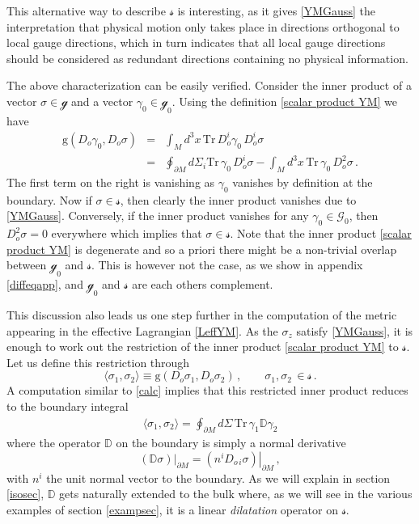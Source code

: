 \documentclass[11pt,a4paper]{article}
\def\calg{{\mathscr G}}
\def\calsg{{\boldsymbol{\mathscr g}}}
\def\calss{{\boldsymbol{\mathscr s}}}
\def\rg{{\mathrm{g}}}
\def\Tr{\mathrm{Tr}}
\def\Dperp{{\mathbb{D}}}
\begin{document}
    \noindent This alternative way to describe $\calss$ is interesting, as it gives \eqref{YMGauss} the interpretation that physical motion only takes place in directions orthogonal to local gauge directions, which in turn indicates that all local gauge directions should be considered as redundant directions containing no physical information. 
    
    The above characterization can be easily verified. Consider the inner product of a vector $\sigma\in\calsg$ and a vector $\gamma_0\in \calsg_0$. Using the definition \eqref{scalar product YM} we have
    \begin{eqnarray}
    \nonumber    \rg(D_o\gamma_0,D_o\sigma)&=&\int_M\! d^3x\, \Tr\,D_o^i\gamma_0\,D_o^i\sigma\nonumber\\
    &=&\oint_{\partial M}\! d\Sigma_i \Tr\,\gamma_0\,D_o^{i}\sigma\label{YMpi}-\int_M\! d^3x\, \Tr\,\gamma_0\,D_o^2\sigma\label{calc}\,.
    \end{eqnarray}
    The first term on the right is vanishing as $\gamma_0$ vanishes by definition at the boundary. Now if $\sigma\in \calss$, then clearly the inner product vanishes due to \eqref{YMGauss}. Conversely, if the inner product vanishes for any $\gamma_0\in \calg_0$, then $D_o^2\sigma=0$ everywhere which implies that $\sigma\in \calss$. Note that the inner product \eqref{scalar product YM} is degenerate and so a priori there might be a non-trivial overlap between $\calsg_0$ and $\calss$. This is however not the case, as we show in appendix \ref{diffeqapp}, and $\calsg_0$ and $\calss$ are each others complement.
    
    This discussion also leads us one step further in the computation of the metric appearing in the effective Lagrangian \eqref{LeffYM}. As the $\sigma_z$ satisfy \eqref{YMGauss}, it is enough to work out the restriction of the inner product \eqref{scalar product YM} to $\calss$. Let us define this restriction through
    \begin{equation}
    \langle\sigma_1,\sigma_2\rangle\equiv\rg(D_o\sigma_{1},D_o\sigma_{2})\,,\qquad \sigma_1,\sigma_2\,\in\calss\,.
    \end{equation}
    A computation similar to \eqref{calc} implies that this restricted inner product reduces to the boundary integral
    \begin{align}
\boxed{    \langle\sigma_1,\sigma_2\rangle=\oint_{\partial M}\! d\Sigma\, \Tr\,\gamma_{1} \Dperp \gamma_{2}\label{angles}}
    \end{align}
    where the operator $\Dperp$ on the boundary is simply a normal derivative
    \begin{equation}
    \left.(\Dperp\sigma)\right|_{\partial M}=\left.(n^i D_{o\,i}\sigma)\right|_{\partial M}\label{Dperpbound}\,,
    \end{equation} 
    with $n^i$ the unit normal vector to the boundary. As we will explain in section \ref{isosec}, $\Dperp$ gets naturally extended to the bulk where, as we will see in the various examples of section \ref{exampsec}, it is a linear \textit{dilatation} operator on $\calss$.
\end{document}
